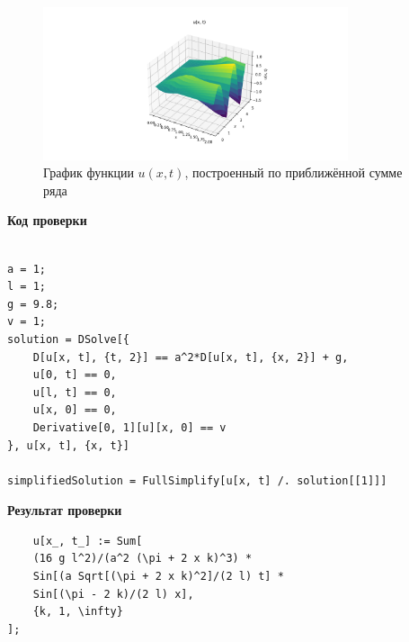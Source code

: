 \documentclass[a4paper,12pt]{article}
\begin{document}
\begin{figure}[H]
    \centering
    \includegraphics[width=0.8\textwidth]{../../graph1.png}
    \caption{График функции $u(x,t)$, построенный по приближённой сумме ряда}

\end{figure}

\textbf{Код проверки}
\begin{lstlisting}
    
a = 1; 
l = 1; 
g = 9.8; 
v = 1; 
solution = DSolve[{
    D[u[x, t], {t, 2}] == a^2*D[u[x, t], {x, 2}] + g,
    u[0, t] == 0,
    u[l, t] == 0,
    u[x, 0] == 0,
    Derivative[0, 1][u][x, 0] == v
}, u[x, t], {x, t}]

simplifiedSolution = FullSimplify[u[x, t] /. solution[[1]]]
\end{lstlisting}
\textbf{Результат проверки}
\begin{lstlisting}
    u[x_, t_] := Sum[
    (16 g l^2)/(a^2 (\pi + 2 x k)^3) * 
    Sin[(a Sqrt[(\pi + 2 x k)^2]/(2 l) t] * 
    Sin[(\pi - 2 k)/(2 l) x],
    {k, 1, \infty}
];
\end{lstlisting}
\end{document}
